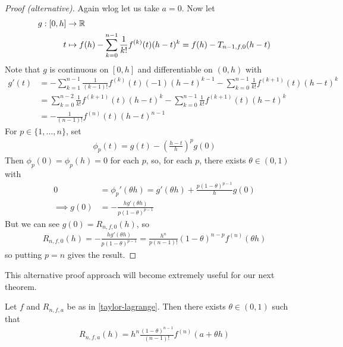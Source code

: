 \documentclass{../template/note}
\begin{document}
    \begin{proof}[Proof (alternative)]
        Again wlog let us take \(a=0\). Now let
        \begin{align*}
            g: [0, h] &\to \mathbb R \\
            t &\mapsto f(h) - \sum_{k=0}^{n-1} \frac 1 {k!} f^{(k)}(t) (h-t)^k = f(h) - T_{n-1,f,0}(h-t)
        \end{align*}
        Note that \(g\) is continuous on \([0, h]\) and differentiable on \((0, h)\) with
        \begin{align*}
            g'(t) &= -\sum_{k=1}^{n-1} \frac 1 {(k-1)!} f^{(k)}(t) (-1) (h-t)^{k-1} - \sum_{k=0}^{n-1} \frac 1 {k!} f^{(k+1)}(t) (h-t)^k \\
            &= \sum_{k=0}^{n-2} \frac 1 {k!} f^{(k+1)}(t)(h-t)^{k} - \sum_{k=0}^{n-1} \frac 1 {k!} f^{(k+1)}(t) (h-t)^k \\
            &= -\frac 1 {(n-1)!} f^{(n)}(t) (h-t)^{n-1}
        \end{align*}
        For \(p \in \{1, \dots, n\}\), set
        \begin{align*}
            \phi_p(t) = g(t) - \left(\frac{h-t}{h}\right)^pg(0)
        \end{align*}
        Then \(\phi_p(0) = \phi_p(h) = 0\) for each \(p\), so, for each \(p\), there exists \(\theta \in (0, 1)\) with
        \begin{align*}
            0 &= \phi_p'(\theta h) = g'(\theta h) + \frac{p(1-\theta)^{p-1}}{h}g(0) \\
            \implies g(0) &= -\frac{hg'(\theta h)}{p(1-\theta)^{p-1}}
        \end{align*}
        But we can see \(g(0) = R_{n, f, 0}(h)\), so
        \begin{align*}
            R_{n, f, 0}(h) = -\frac{hg'(\theta h)}{p(1-\theta)^{p-1}} = \frac{h^n}{p(n-1)!}(1-\theta)^{n-p}f^{(n)}(\theta h)
        \end{align*}
        so putting \(p = n\) gives the result.
    \end{proof}
    
    This alternative proof approach will become extremely useful for our next theorem.

    \begin{theorem}
        \label{taylor-cauchy}
        Let \(f\) and \(R_{n,f,a}\) be as in \cref{taylor-lagrange}. Then there exists \(\theta \in (0, 1)\) such that
        \begin{align*}
            R_{n, f, a}(h) = h^n \frac{(1-\theta)^{n-1}}{(n-1)!} f^{(n)}(a + \theta h)
        \end{align*}
    \end{theorem}
\end{document}
